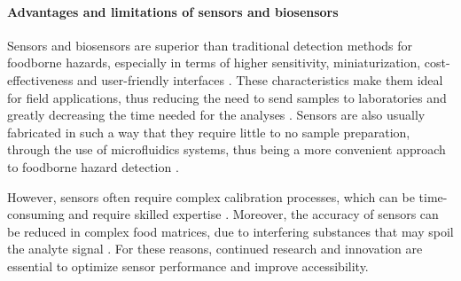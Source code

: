 \paragraph{Advantages and limitations of sensors and biosensors}
Sensors and biosensors are superior than traditional detection methods for foodborne hazards, especially in terms of higher sensitivity, miniaturization, cost-effectiveness and user-friendly interfaces \citep{perfezouCancer2012,cardenosa-rubioRecent2019,yangDynamic2022}. These characteristics make them ideal for field applications, thus reducing the need to send samples to laboratories and greatly decreasing the time needed for the analyses \citep{byrneAntibodyBased2009,sonPortable2017,zhangApplying2017}. Sensors are also usually fabricated in such a way that they require little to no sample preparation, \eg{} through the use of microfluidics systems, thus being a more convenient approach to foodborne hazard detection \citep{hendricksonSensitive2021,liRapid2021}.

However, sensors often require complex calibration processes, which can be time-consuming and require skilled expertise \citep{yangCNNLSTM2020}. Moreover, the accuracy of sensors can be reduced in complex food matrices, due to interfering substances that may spoil the analyte signal \citep{gillibertSurface2017,hanRatiometric2021}.
For these reasons, continued research and innovation are essential to optimize sensor performance and improve accessibility.
